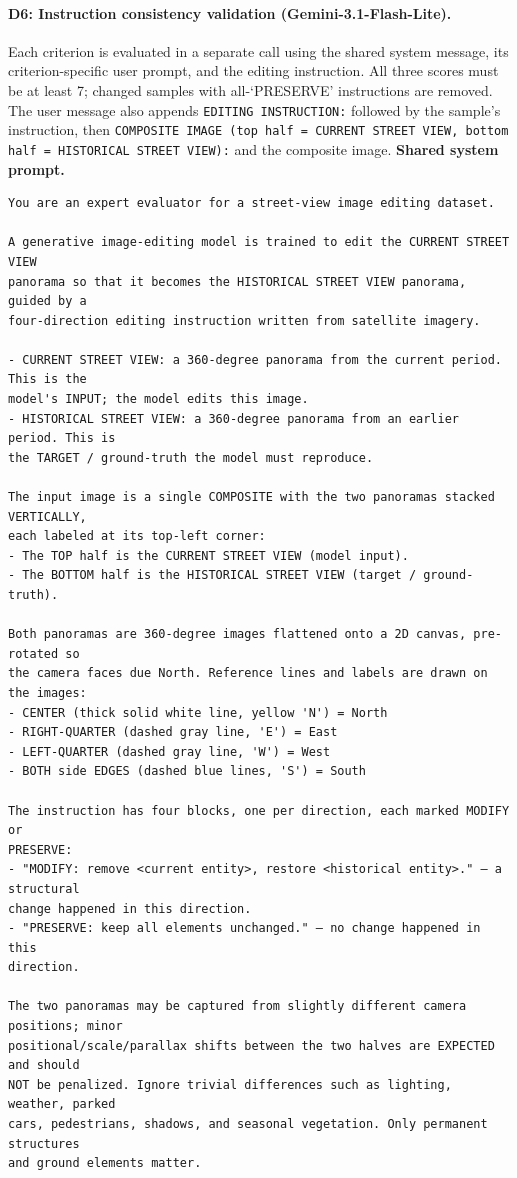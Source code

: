 \paragraph{D6: Instruction consistency validation (Gemini-3.1-Flash-Lite).}
Each criterion is evaluated in a separate call using the shared system message, its criterion-specific user prompt, and the editing instruction. All three scores must be at least 7; changed samples with all-`PRESERVE' instructions are removed.
The user message also appends \texttt{EDITING INSTRUCTION:} followed by the sample's instruction, then \texttt{COMPOSITE IMAGE (top half = CURRENT STREET VIEW, bottom half = HISTORICAL STREET VIEW):} and the composite image.
\noindent\textbf{Shared system prompt.}\par
\begingroup\fontsize{8}{10}\selectfont
\begin{promptbox}
\begin{verbatim}
You are an expert evaluator for a street-view image editing dataset.

A generative image-editing model is trained to edit the CURRENT STREET VIEW
panorama so that it becomes the HISTORICAL STREET VIEW panorama, guided by a
four-direction editing instruction written from satellite imagery.

- CURRENT STREET VIEW: a 360-degree panorama from the current period. This is the
model's INPUT; the model edits this image.
- HISTORICAL STREET VIEW: a 360-degree panorama from an earlier period. This is
the TARGET / ground-truth the model must reproduce.

The input image is a single COMPOSITE with the two panoramas stacked VERTICALLY,
each labeled at its top-left corner:
- The TOP half is the CURRENT STREET VIEW (model input).
- The BOTTOM half is the HISTORICAL STREET VIEW (target / ground-truth).

Both panoramas are 360-degree images flattened onto a 2D canvas, pre-rotated so
the camera faces due North. Reference lines and labels are drawn on the images:
- CENTER (thick solid white line, yellow 'N') = North
- RIGHT-QUARTER (dashed gray line, 'E') = East
- LEFT-QUARTER (dashed gray line, 'W') = West
- BOTH side EDGES (dashed blue lines, 'S') = South

The instruction has four blocks, one per direction, each marked MODIFY or
PRESERVE:
- "MODIFY: remove <current entity>, restore <historical entity>." — a structural
change happened in this direction.
- "PRESERVE: keep all elements unchanged." — no change happened in this
direction.

The two panoramas may be captured from slightly different camera positions; minor
positional/scale/parallax shifts between the two halves are EXPECTED and should
NOT be penalized. Ignore trivial differences such as lighting, weather, parked
cars, pedestrians, shadows, and seasonal vegetation. Only permanent structures
and ground elements matter.
\end{verbatim}
\end{promptbox}
\endgroup

